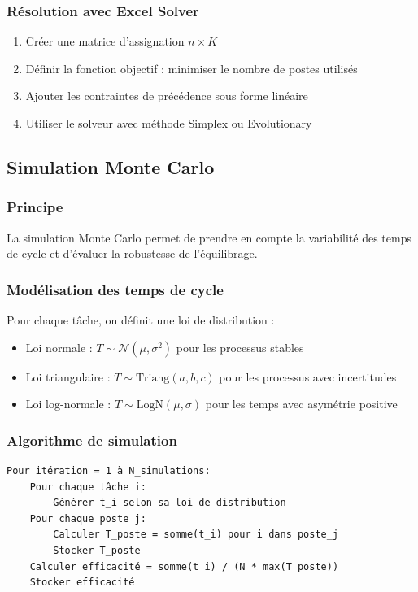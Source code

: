 \documentclass[12pt,a4paper]{article}
\begin{document}
\begin{center}
\subsubsection{Résolution avec Excel Solver}

\begin{enumerate}
    \item Créer une matrice d'assignation \(n \times K\)
    \item Définir la fonction objectif : minimiser le nombre de postes utilisés
    \item Ajouter les contraintes de précédence sous forme linéaire
    \item Utiliser le solveur avec méthode Simplex ou Evolutionary
\end{enumerate}

\subsection{Simulation Monte Carlo}

\subsubsection{Principe}
La simulation Monte Carlo permet de prendre en compte la variabilité des temps de cycle et d'évaluer la robustesse de l'équilibrage.

\subsubsection{Modélisation des temps de cycle}

Pour chaque tâche, on définit une loi de distribution :
\begin{itemize}
    \item Loi normale : \(T \sim \mathcal{N}(\mu, \sigma^2)\) pour les processus stables
    \item Loi triangulaire : \(T \sim \text{Triang}(a, b, c)\) pour les processus avec incertitudes
    \item Loi log-normale : \(T \sim \text{LogN}(\mu, \sigma)\) pour les temps avec asymétrie positive
\end{itemize}

\subsubsection{Algorithme de simulation}

\begin{verbatim}
Pour itération = 1 à N_simulations:
    Pour chaque tâche i:
        Générer t_i selon sa loi de distribution
    Pour chaque poste j:
        Calculer T_poste = somme(t_i) pour i dans poste_j
        Stocker T_poste
    Calculer efficacité = somme(t_i) / (N * max(T_poste))
    Stocker efficacité


\end{verbatim}
\end{center}
\end{document}
